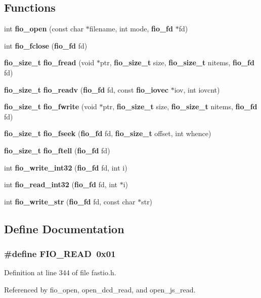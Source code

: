 \subsection*{Functions}
\begin{CompactItemize}
\item 
int {\bf fio\_\-open} (const char $\ast$filename, int mode, {\bf fio\_\-fd} $\ast$fd)
\item 
int {\bf fio\_\-fclose} ({\bf fio\_\-fd} fd)
\item 
{\bf fio\_\-size\_\-t} {\bf fio\_\-fread} (void $\ast$ptr, {\bf fio\_\-size\_\-t} size, {\bf fio\_\-size\_\-t} nitems, {\bf fio\_\-fd} fd)
\item 
{\bf fio\_\-size\_\-t} {\bf fio\_\-readv} ({\bf fio\_\-fd} fd, const {\bf fio\_\-iovec} $\ast$iov, int iovcnt)
\item 
{\bf fio\_\-size\_\-t} {\bf fio\_\-fwrite} (void $\ast$ptr, {\bf fio\_\-size\_\-t} size, {\bf fio\_\-size\_\-t} nitems, {\bf fio\_\-fd} fd)
\item 
{\bf fio\_\-size\_\-t} {\bf fio\_\-fseek} ({\bf fio\_\-fd} fd, {\bf fio\_\-size\_\-t} offset, int whence)
\item 
{\bf fio\_\-size\_\-t} {\bf fio\_\-ftell} ({\bf fio\_\-fd} fd)
\item 
int {\bf fio\_\-write\_\-int32} ({\bf fio\_\-fd} fd, int i)
\item 
int {\bf fio\_\-read\_\-int32} ({\bf fio\_\-fd} fd, int $\ast$i)
\item 
int {\bf fio\_\-write\_\-str} ({\bf fio\_\-fd} fd, const char $\ast$str)
\end{CompactItemize}


\subsection{Define Documentation}
\subsubsection{\setlength{\rightskip}{0pt plus 5cm}\#define FIO\_\-READ\ 0x01}\label{fastio_8h_a0}




Definition at line 344 of file fastio.h.

Referenced by fio\_\-open, open\_\-dcd\_\-read, and open\_\-js\_\-read.
